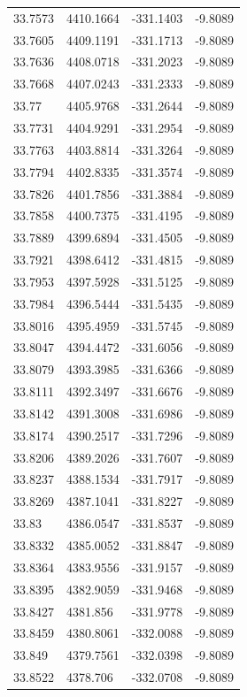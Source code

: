 \begin{table}[H]
\begin{tabular}{llll}
33.7573 & 4410.1664 & -331.1403 & -9.8089 \\
33.7605 & 4409.1191 & -331.1713 & -9.8089 \\
33.7636 & 4408.0718 & -331.2023 & -9.8089 \\
33.7668 & 4407.0243 & -331.2333 & -9.8089 \\
33.77 & 4405.9768 & -331.2644 & -9.8089 \\
33.7731 & 4404.9291 & -331.2954 & -9.8089 \\
33.7763 & 4403.8814 & -331.3264 & -9.8089 \\
33.7794 & 4402.8335 & -331.3574 & -9.8089 \\
33.7826 & 4401.7856 & -331.3884 & -9.8089 \\
33.7858 & 4400.7375 & -331.4195 & -9.8089 \\
33.7889 & 4399.6894 & -331.4505 & -9.8089 \\
33.7921 & 4398.6412 & -331.4815 & -9.8089 \\
33.7953 & 4397.5928 & -331.5125 & -9.8089 \\
33.7984 & 4396.5444 & -331.5435 & -9.8089 \\
33.8016 & 4395.4959 & -331.5745 & -9.8089 \\
33.8047 & 4394.4472 & -331.6056 & -9.8089 \\
33.8079 & 4393.3985 & -331.6366 & -9.8089 \\
33.8111 & 4392.3497 & -331.6676 & -9.8089 \\
33.8142 & 4391.3008 & -331.6986 & -9.8089 \\
33.8174 & 4390.2517 & -331.7296 & -9.8089 \\
33.8206 & 4389.2026 & -331.7607 & -9.8089 \\
33.8237 & 4388.1534 & -331.7917 & -9.8089 \\
33.8269 & 4387.1041 & -331.8227 & -9.8089 \\
33.83 & 4386.0547 & -331.8537 & -9.8089 \\
33.8332 & 4385.0052 & -331.8847 & -9.8089 \\
33.8364 & 4383.9556 & -331.9157 & -9.8089 \\
33.8395 & 4382.9059 & -331.9468 & -9.8089 \\
33.8427 & 4381.856 & -331.9778 & -9.8089 \\
33.8459 & 4380.8061 & -332.0088 & -9.8089 \\
33.849 & 4379.7561 & -332.0398 & -9.8089 \\
33.8522 & 4378.706 & -332.0708 & -9.8089 \\

\end{tabular}
\end{table}
